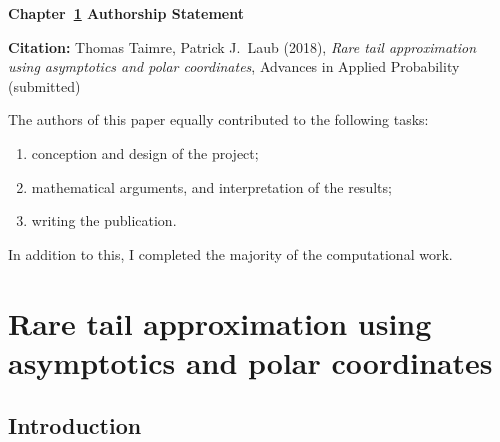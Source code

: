 \vspace*{\fill}

{\large \bf Chapter~\ref{chp:angular} Authorship Statement}

\vspace{1em}

{\bf Citation:} Thomas Taimre, Patrick J.\ Laub (2018), \emph{Rare tail approximation using asymptotics and polar coordinates}, Advances in Applied Probability (submitted)

\vspace{1em}

The authors of this paper equally contributed to the following tasks:
\begin{enumerate}
\item conception and design of the project;
\item mathematical arguments, and interpretation of the results;
\item writing the publication.
\end{enumerate}

In addition to this, I completed the majority of the computational work.

\vspace{3em}

\vspace*{\fill}

\chapter{Rare tail approximation using asymptotics and polar coordinates} \label{chp:angular}

\section{Introduction}


